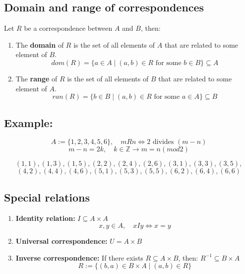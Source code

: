 \documentclass[11pt]{article}
\begin{document}
\subsection{Domain and range of correspondences}
Let $R$ be a correspondence between $A$ and $B$, then:
\begin{enumerate}
    \item The \textbf{domain} of $R$ is the set of all elements of $A$ that are related to some element of $B$.
        \[ dom(R) = \{a \in A \mid (a,b) \in R \text{ for some } b \in B\} \subseteq A\]
    \item The \textbf{range} of $R$ is the set of all elements of $B$ that are related to some element of $A$.
        \[ ran(R) = \{b \in B \mid (a,b) \in R \text{ for some } a \in A\} \subseteq B\]
\end{enumerate}

\subsection*{Example:}
\[
A := \{1, 2, 3, 4, 5, 6\}, \quad mRn \Longleftrightarrow 2 \text{ divides } (m - n) 
\]
\[
m - n = 2k, \quad k \in \mathbb{Z} \rightarrow m = n (mod 2)
\]

\[
(1,1), (1,3), (1,5), (2,2), (2,4), (2,6), (3,1), (3,3), (3,5), 
\]
\[
(4,2), (4,4), (4,6), (5,1), (5,3), (5,5), (6,2), (6,4), (6,6)
\]

\subsection{Special relations}
\begin{enumerate}
    \item \textbf{Identity relation:} $I \subseteq A \times A$
        \[
        x,y \in A, \quad xIy \Longleftrightarrow x = y
        \]
    \item \textbf{Universal correspondence:} $U = A \times B$
    \item \textbf{Inverse correspondence:} If there exists $R \subseteq A \times B$, then: $R^{-1} \subseteq B \times A$
        \[
        R := \{(b,a) \in B \times A \mid (a,b) \in R\}
        \]
\end{enumerate}
\end{document}
